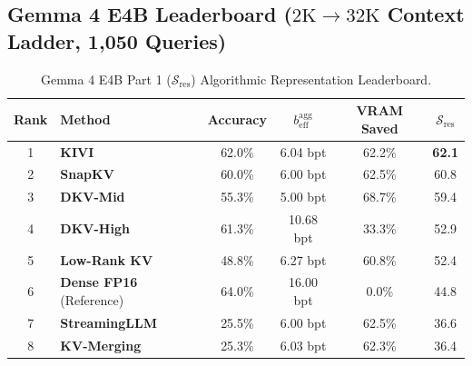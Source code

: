 \documentclass[10pt]{article}
\theoremstyle{definition}
\begin{document}
\clearpage
\subsection{Gemma 4 E4B Leaderboard (\texorpdfstring{$2\text{K} \to 32\text{K}$}{2K to 32K} Context Ladder, 1,050 Queries)}

\begin{table}[h]
\vspace{6pt}
\centering
\small
\caption{Gemma 4 E4B Part 1 ($\mathcal{S}_{\text{res}}$) Algorithmic Representation Leaderboard.}
\label{tab:e4b_sres}
\begin{tabular}{clcccc}
\toprule
\textbf{Rank} & \textbf{Method} & \textbf{Accuracy} & $b_{\text{eff}}^{\text{agg}}$ & \textbf{VRAM Saved} & $\mathcal{S}_{\text{res}}$ \\
\midrule
1 & \textbf{KIVI} & 62.0\% & 6.04 bpt & 62.2\% & \textbf{62.1} \\
2 & \textbf{SnapKV} & 60.0\% & 6.00 bpt & 62.5\% & 60.8 \\
3 & \textbf{DKV-Mid} & 55.3\% & 5.00 bpt & 68.7\% & 59.4 \\
4 & \textbf{DKV-High} & 61.3\% & 10.68 bpt & 33.3\% & 52.9 \\
5 & \textbf{Low-Rank KV} & 48.8\% & 6.27 bpt & 60.8\% & 52.4 \\
6 & \textbf{Dense FP16} (Reference) & 64.0\% & 16.00 bpt & 0.0\% & 44.8 \\
7 & \textbf{StreamingLLM} & 25.5\% & 6.00 bpt & 62.5\% & 36.6 \\
8 & \textbf{KV-Merging} & 25.3\% & 6.03 bpt & 62.3\% & 36.4 \\
\bottomrule
\end{tabular}
\end{table}
\end{document}
